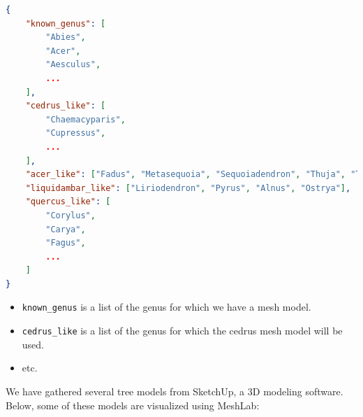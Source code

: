 \documentclass[12pt]{article}
\begin{document}
\newpage

\begin{lstlisting}[language=json]
{
    "known_genus": [
        "Abies",
        "Acer",
        "Aesculus",
        ...
    ],
    "cedrus_like": [
        "Chaemacyparis",
        "Cupressus",
        ...
    ],
    "acer_like": ["Fadus", "Metasequoia", "Sequoiadendron", "Thuja", "Tsuga"],
    "liquidambar_like": ["Liriodendron", "Pyrus", "Alnus", "Ostrya"],
    "quercus_like": [
        "Corylus",
        "Carya",
        "Fagus",
        ...
    ]
}
\end{lstlisting}

\begin{itemize}
    \item \texttt{known\_genus} is a list of the genus for which we have a mesh model.
    \item \texttt{cedrus\_like} is a list of the genus for which the cedrus mesh model will be used.
    \item etc.
\end{itemize}

We have gathered several tree models from SketchUp\cite{SketchUp},
a 3D modeling software.
Below, some of these models are visualized using MeshLab\cite{meshlab}:
\end{document}
